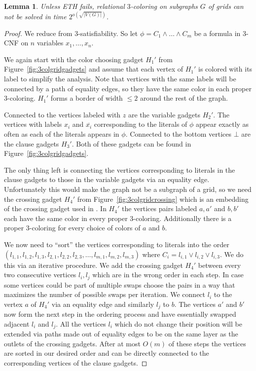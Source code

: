 \documentclass[10pt,a4paper]{article}
\numberwithin{equation}{section}
\newtheorem{lemma}[equation]{Lemma}
\theoremstyle{definition}
\begin{document}
\begin{lemma}
    \label{lem:3colgrid}
    Unless ETH fails, relational $3$-coloring on subgraphs $G$ of grids can not be solved in time $2^{o\left(\sqrt{|V(G)|}\right)}$.
\end{lemma}
\begin{proof}
    We reduce from $3$-satisfiability.
    So let $\phi = C_1 \land \ldots \land C_m$ be a formula in $3$-CNF on $n$ variables $x_1, \ldots, x_n$.

    We again start with the color choosing gadget $H_1'$ from Figure~\ref{fig:3colgridgadgets} and assume that each vertex of $H_1'$ is colored with its label to simplify the analysis.
    Note that vertices with the same labels will be connected by a path of equality edges, so they have the same color in each proper $3$-coloring.
    $H_1'$ forms a border of width $\leq 2$ around the rest of the graph.

    Connected to the vertices labeled with $z$ are the variable gadgets $H_2'$.
    The vertices with labels $x_i$ and $\overline{x_i}$ corresponding to the literals of $\phi$ appear exactly as often as each of the literals appears in $\phi$.
    Connected to the bottom vertices $\bot$ are the clause gadgets $H_3'$.
    Both of these gadgets can be found in Figure~\ref{fig:3colgridgadgets}.

    The only thing left is connecting the vertices corresponding to literals in the clause gadgets to those in the variable gadgets via an equality edge.
    Unfortunately this would make the graph not be a subgraph of a grid, so we need the crossing gadget $H_4'$ from Figure~\ref{fig:3colgridcrossing} which is an embedding of the crossing gadget used in \cite{DBLP:journals/tcs/GareyJS76}.
    In $H_4'$ the vertices pairs labeled $a, a'$ and $b, b'$ each have the same color in every proper $3$-coloring.
    Additionally there is a proper $3$-coloring for every choice of colors of $a$ and $b$.

    We now need to ``sort'' the vertices corresponding to literals into the order $(l_{1,1}, l_{1,2}, l_{1,3}, l_{2,1}, l_{2,2}, l_{2,3}, \ldots, l_{m,1}, l_{m,2}, l_{m,3})$ where $C_i = l_{i, 1} \lor l_{i, 2} \lor l_{i, 3}$.
    We do this via an iterative procedure.
    We add the crossing gadget $H_4'$ between every two consecutive vertices $l_i, l_j$ which are in the wrong order in each step.
    In case some vertices could be part of multiple swaps choose the pairs in a way that maximizes the number of possible swaps per iteration.
    We connect $l_i$ to the vertex $a$ of $H_4'$ via an equality edge and similarly $l_j$ to $b$.
    The vertices $a'$ and $b'$ now form the next step in the ordering process and have essentially swapped adjacent $l_i$ and $l_j$.
    All the vertices $l_i$ which do not change their position will be extended via paths made out of equality edges to be on the same layer as the outlets of the crossing gadgets.
    After at most $O(m)$ of these steps the vertices are sorted in our desired order and can be directly connected to the corresponding vertices of the clause gadgets.


\end{proof}
\end{document}

